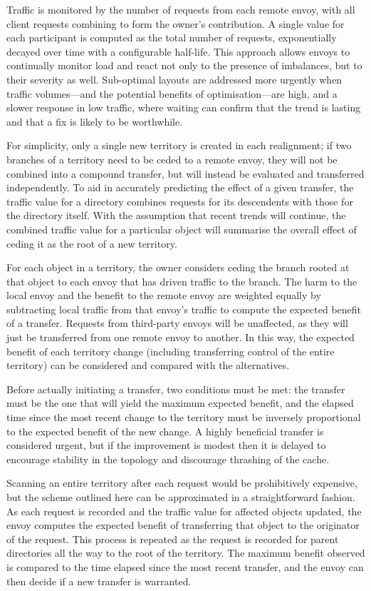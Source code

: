 Traffic is monitored by the number of requests from each remote envoy, with all client requests combining to form the owner's contribution. A single value for each participant is computed as the total number of requests, exponentially decayed over time with a configurable half-life. This approach allows envoys to continually monitor load and react not only to the presence of imbalances, but to their severity as well. Sub-optimal layouts are addressed more urgently when traffic volumes---and the potential benefits of optimisation---are high, and a slower response in low traffic, where waiting can confirm that the trend is lasting and that a fix is likely to be worthwhile.

For simplicity, only a single new territory is created in each realignment; if two branches of a territory need to be ceded to a remote envoy, they will not be combined into a compound transfer, but will instead be evaluated and transferred independently. To aid in accurately predicting the effect of a given transfer, the traffic value for a directory combines requests for its descendents with those for the directory itself. With the assumption that recent trends will continue, the combined traffic value for a particular object will summarise the overall effect of ceding it as the root of a new territory.

For each object in a territory, the owner considers ceding the branch rooted at that object to each envoy that has driven traffic to the branch. The harm to the local envoy and the benefit to the remote envoy are weighted equally by subtracting local traffic from that envoy's traffic to compute the expected benefit of a transfer. Requests from third-party envoys will be unaffected, as they will just be transferred from one remote envoy to another. In this way, the expected benefit of each territory change (including transferring control of the entire territory) can be considered and compared with the alternatives.

Before actually initiating a transfer, two conditions must be met: the transfer must be the one that will yield the maximum expected benefit, and the elapsed time since the most recent change to the territory must be inversely proportional to the expected benefit of the new change. A highly beneficial transfer is considered urgent, but if the improvement is modest then it is delayed to encourage stability in the topology and discourage thrashing of the cache.

Scanning an entire territory after each request would be prohibitively expensive, but the scheme outlined here can be approximated in a straightforward fashion. As each request is recorded and the traffic value for affected objects updated, the envoy computes the expected benefit of transferring that object to the originator of the request. This process is repeated as the request is recorded for parent directories all the way to the root of the territory. The maximum benefit observed is compared to the time elapsed since the most recent transfer, and the envoy can then decide if a new transfer is warranted.

